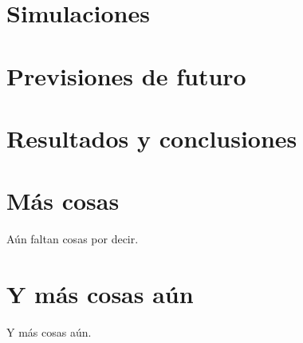 \documentclass[12pt,a4paper]{book}
\begin{document}
\chapter{Simulaciones} \label{chap:Simulaciones}

\chapter{Previsiones de futuro} \label{chap:Futuro}

\chapter{Resultados y conclusiones} \label{chap:Conclusiones}

\appendix
\appendixpage
\noappendicestocpagenum
\addappheadtotoc

\chapter{Más cosas}\label{App:A}
Aún faltan cosas por decir.

\chapter{Y más cosas aún}\label{App:B}
Y más cosas aún.


\end{document}
